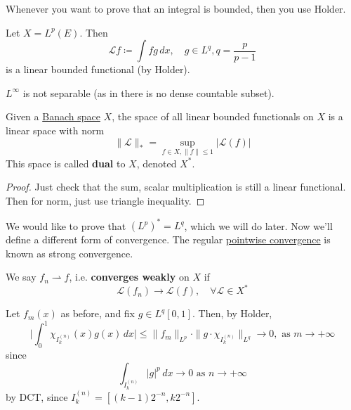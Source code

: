   Whenever you want to prove that an integral is bounded, then you use Holder. 

  \begin{example}
    \label{ex:integration-against-ginlq-as-a-bounded}
    Let $X = L^p (E)$. Then 
    \begin{equation}
      \mathcal{L} f \coloneqq \int f g \,dx, \quad g \in L^q, q = \frac{p}{p - 1}
    \end{equation}
    is a linear bounded functional (by Holder). 
  \end{example}

  $L^\infty$ is not separable (as in there is no dense countable subset). 

  \begin{theorem}
    \label{thm:the-dual-of-a-banach-space}
    Given a \hyperref[mv-def:banach-space]{Banach space} $X$, the space of all linear bounded functionals on $X$ is a linear space with norm 
    \begin{equation}
      \|\mathcal{L}\|_\ast = \sup_{f \in X, \|f\| \leq 1} | \mathcal{L} (f) |
    \end{equation}
    This space is called \textbf{dual} to $X$, denoted $X^\ast$. 
  \end{theorem}
  \begin{proof}
    Just check that the sum, scalar multiplication is still a linear functional. Then for norm, just use triangle inequality. 
  \end{proof}

  We would like to prove that $(L^p)^\ast = L^q$, which we will do later. Now we'll define a different form of convergence. The regular \hyperref[real-def:pointwise-convergence]{pointwise convergence} is known as strong convergence. 

  \begin{definition}
    \label{def:weak-convergence}
    We say $f_n \rightharpoonup f$, i.e. \textbf{converges weakly} on $X$ if 
    \begin{equation}
      \mathcal{L}(f_n) \to \mathcal{L}(f), \quad \forall \mathcal{L} \in X^\ast
    \end{equation}
  \end{definition}


  \begin{example}
    \label{ex:functionals-agreeing-on-a-dense-subset}
    Let $f_m(x)$ as before, and fix $g \in L^q [0, 1]$. Then, by Holder, 
    \begin{equation}
      \bigg| \int_0^1 \chi_{I_k^{(n)}} (x) g(x)\,dx  \bigg| \leq \|f_m\|_{L^p} \cdot \| g \cdot \chi_{I_k^{(n)}}\|_{L^q} \to 0, \text{ as } m \to +\infty
    \end{equation}
    since 
    \begin{equation}
      \int_{I_k^{(n)}} |g|^p \,dx \to 0 \text{ as } n \to +\infty
    \end{equation}
    by DCT, since $I_k^{(n)} = [(k-1) 2^{-n}, k 2^{-n}]$. 
  \end{example}

